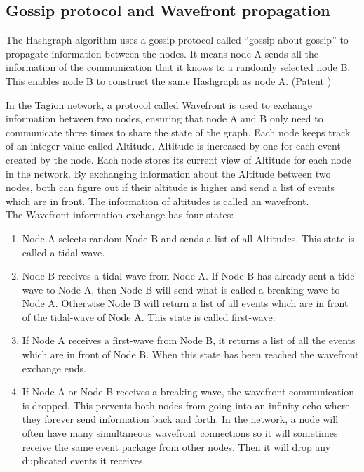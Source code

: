 \subsection{Gossip protocol and Wavefront propagation}
The Hashgraph algorithm uses a gossip protocol called “gossip about gossip” to propagate information between the nodes. It means node A sends all the information of the communication that it knows to a randomly selected node B. This enables node B to construct the same Hashgraph as node A. (Patent \cite{wavefront_patent})

In the Tagion network, a protocol called Wavefront is used to exchange information between two nodes, ensuring that node A and B only need to communicate three times to share the state of the graph.
Each node keeps track of an integer value called Altitude. Altitude is increased by one for each event created by the node. Each node stores its current view of Altitude for each node in the network.
By exchanging information about the Altitude between two nodes, both can figure out if their altitude is higher and send a list of events which are in front. The information of altitudes is called an wavefront.\\ 

The Wavefront information exchange has four states:
\begin{enumerate}
 \item 
 Node A selects random Node B and sends a list of all Altitudes. This state is called a tidal-wave.
 \item 
 Node B receives a tidal-wave from Node A. If Node B has already sent a tide-wave to Node A, then Node B will send what is called a breaking-wave to Node A. Otherwise Node B will return a list of all events which are in front of the tidal-wave of Node A. This state is called first-wave.
 \item 
 If Node A receives a first-wave from Node B, it returns a list of all the events which are in front of Node B. When this state has been reached the wavefront exchange ends.
 \item 
 If Node A or Node B receives a breaking-wave, the wavefront communication is dropped. This prevents both nodes from going into an infinity echo where they forever send information back and forth.
In the network, a node will often have many simultaneous wavefront connections so it will sometimes receive the same event package from other nodes. Then it will drop any duplicated events it receives.  
\end{enumerate}

